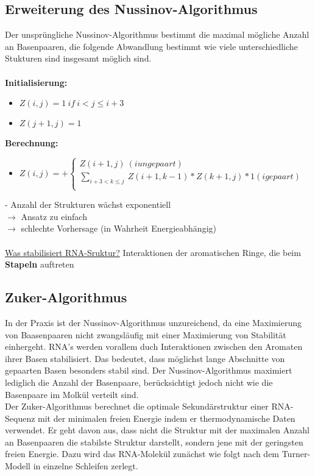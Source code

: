 \subsection{Erweiterung des Nussinov-Algorithmus}

Der unspr\"ungliche Nussinov-Algorithmus bestimmt die maximal m\"ogliche Anzahl an Basenpaaren, die folgende Abwandlung bestimmt wie viele unterschiedliche Stukturen sind insgesamt m\"oglich sind.
\\\\
\textbf{Initialisierung:}
\begin{itemize}
	\item[] $Z(i,j)=1\ if\ i<j\le i+3$ 
	\item[] $Z(j+1, j) = 1$
\end{itemize}
\textbf{Berechnung:}
\begin{itemize}
	\item[]$Z(i,j)=+ \begin{cases}
               Z(i+1, j)\ (i ungepaart)\\
               \displaystyle\sum_{i+3<k \le j}\ Z(i+1, k-1) * Z(k+1, j) * 1 (i gepaart)\\
\end{cases}$
\end{itemize}

 -  Anzahl der Strukturen wächst exponentiell\\
$\rightarrow$ Ansatz zu einfach\\
$\rightarrow$ schlechte Vorhersage (in Wahrheit Energieabhängig)\\
\\
\underline{Was stabilisiert RNA-Sruktur?} Interaktionen der aromatischen Ringe, die beim \textbf{Stapeln} auftreten

\subsection{Zuker-Algorithmus}


In der Praxis ist der Nussinov-Algorithmus unzureichend, da eine Maximierung von Baasenpaaren nicht zwangsl\"aufig mit einer Maximierung von Stabilit\"at einhergeht. RNA's werden vorallem duch Interaktionen zwischen den Aromaten ihrer Basen stabilisiert. Das bedeutet, dass m\"oglichst lange Abschnitte von gepaarten Basen besonders stabil sind. Der Nussinov-Algorithmus maximiert lediglich die Anzahl der Basenpaare, ber\"ucksichtigt jedoch nicht wie die Basenpaare im Molkül verteilt sind. 
\\
Der Zuker-Algorithmus berechnet die optimale Sekundärstruktur einer RNA-Sequenz mit der minimalen freien Energie indem er thermodynamische Daten verwendet. Er geht davon aus, dass nicht die Struktur mit der maximalen Anzahl an Basenpaaren die stabilste Struktur darstellt, sondern jene mit der geringsten freien Energie. Dazu wird das RNA-Molek\"ul zunächst wie folgt nach dem Turner-Modell in einzelne Schleifen zerlegt.

